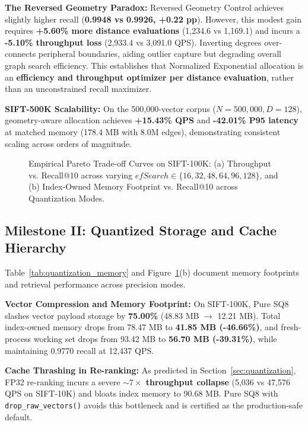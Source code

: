 \documentclass[10pt,journal,compsoc]{IEEEtran}
\begin{document}
\textbf{The Reversed Geometry Paradox:} Reversed Geometry Control achieves slightly higher recall (\textbf{0.9948 vs 0.9926, +0.22 pp}). However, this modest gain requires \textbf{+5.60\% more distance evaluations} (1,234.6 vs 1,169.1) and incurs a \textbf{-5.10\% throughput loss} (2,933.4 vs 3,091.0 QPS). Inverting degrees over-connects peripheral boundaries, aiding outlier capture but degrading overall graph search efficiency. This establishes that Normalized Exponential allocation is an \textbf{efficiency and throughput optimizer per distance evaluation}, rather than an unconstrained recall maximizer.

\textbf{SIFT-500K Scalability:} On the 500,000-vector corpus ($N=500{,}000, D=128$), geometry-aware allocation achieves \textbf{+15.43\% QPS} and \textbf{-42.01\% P95 latency} at matched memory (178.4 MB with 8.0M edges), demonstrating consistent scaling across orders of magnitude.



\begin{figure}[t]
\centering

\caption{Empirical Pareto Trade-off Curves on SIFT-100K: (a) Throughput vs. Recall@10 across varying $efSearch \in \{16, 32, 48, 64, 96, 128\}$, and (b) Index-Owned Memory Footprint vs. Recall@10 across Quantization Modes.}
\label{fig:tradeoffs}
\end{figure}

\subsection{Milestone II: Quantized Storage and Cache Hierarchy}
Table~\ref{tab:quantization_memory} and Figure~\ref{fig:tradeoffs}(b) document memory footprints and retrieval performance across precision modes.

\textbf{Vector Compression and Memory Footprint:} On SIFT-100K, Pure SQ8 slashes vector payload storage by \textbf{75.00\%} (48.83 MB $\to$ 12.21 MB). Total index-owned memory drops from 78.47 MB to \textbf{41.85 MB (-46.66\%)}, and fresh-process working set drops from 93.42 MB to \textbf{56.70 MB (-39.31\%)}, while maintaining 0.9770 recall at 12,437 QPS.

\textbf{Cache Thrashing in Re-ranking:} As predicted in Section~\ref{sec:quantization}, FP32 re-ranking incurs a severe \textbf{$\sim 7\times$ throughput collapse} (5,036 vs 47,576 QPS on SIFT-10K) and bloats index memory to 90.68 MB. Pure SQ8 with \texttt{drop\_raw\_vectors()} avoids this bottleneck and is certified as the production-safe default.
\end{document}
